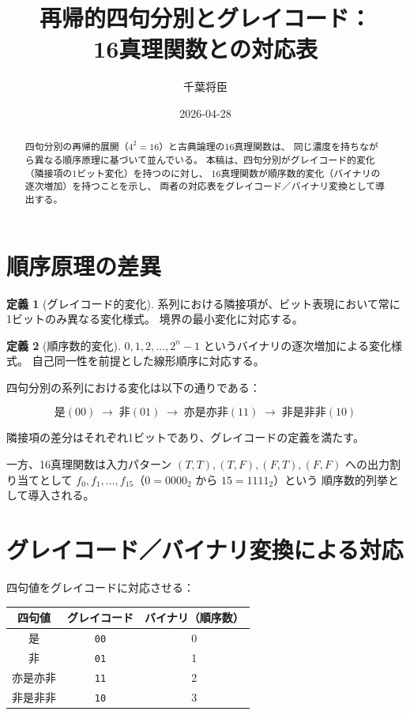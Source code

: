 \documentclass[11pt,a4paper]{article}
\theoremstyle{definition}
\newtheorem{definition}{定義}[section]
\begin{document}
\title{再帰的四句分別とグレイコード：\\16真理関数との対応表}
\author{千葉将臣}
\date{2026-04-28}
\maketitle

\begin{abstract}
四句分別の再帰的展開（$4^2 = 16$）と古典論理の16真理関数は、
同じ濃度を持ちながら異なる順序原理に基づいて並んでいる。
本稿は、四句分別がグレイコード的変化（隣接項の1ビット変化）を持つのに対し、
16真理関数が順序数的変化（バイナリの逐次増加）を持つことを示し、
両者の対応表をグレイコード／バイナリ変換として導出する。
\end{abstract}

\section{順序原理の差異}

\begin{definition}[グレイコード的変化]
系列における隣接項が、ビット表現において常に1ビットのみ異なる変化様式。
境界の最小変化に対応する。
\end{definition}

\begin{definition}[順序数的変化]
$0, 1, 2, \ldots, 2^n - 1$ というバイナリの逐次増加による変化様式。
自己同一性を前提とした線形順序に対応する。
\end{definition}

四句分別の系列における変化は以下の通りである：

\[
\text{是}(00) \;\to\; \text{非}(01) \;\to\; \text{亦是亦非}(11) \;\to\; \text{非是非非}(10)
\]

隣接項の差分はそれぞれ1ビットであり、グレイコードの定義を満たす。

一方、16真理関数は入力パターン $(T,T),(T,F),(F,T),(F,F)$ への出力割り当てとして
$f_0, f_1, \ldots, f_{15}$（$0 = 0000_2$ から $15 = 1111_2$）という
順序数的列挙として導入される。

\section{グレイコード／バイナリ変換による対応}

四句値をグレイコードに対応させる：

\begin{center}
\begin{tabular}{ccc}
\toprule
四句値 & グレイコード & バイナリ（順序数） \\
\midrule
是      & \texttt{00} & 0 \\
非      & \texttt{01} & 1 \\
亦是亦非 & \texttt{11} & 2 \\
非是非非 & \texttt{10} & 3 \\
\bottomrule
\end{tabular}
\end{center}
\end{document}
